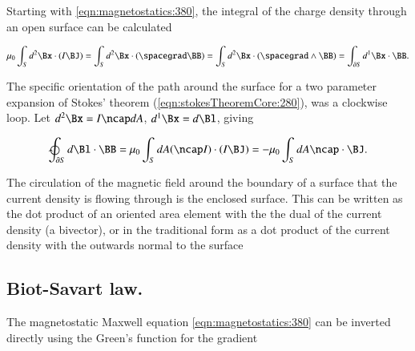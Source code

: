 Starting with
\cref{eqn:magnetostatics:380}, the
integral of the
charge density through an open surface can be calculated

\begin{dmath}\label{eqn:magnetostatics:720}
\mu_0 \int_S d^2 \Bx \cdot (I \BJ)
=
\int_S d^2 \Bx \cdot (\spacegrad \BB)
=
\int_S d^2 \Bx \cdot (\spacegrad \wedge \BB)
=
\int_{\partial S} d^1 \Bx \cdot \BB.
\end{dmath}

The specific orientation of the path around the surface for a two parameter expansion of Stokes' theorem (\cref{eqn:stokesTheoremCore:280}), was a clockwise loop.  Let
\( d^2 \Bx = I \ncap dA \), \( d^1 \Bx = d\Bl \), giving

\begin{dmath}\label{eqn:magnetostatics:740}
\ointclockwise_{\partial S} d\Bl \cdot \BB
= \mu_0 \int_S dA (\ncap I) \cdot (I \BJ)
= -\mu_0 \int_S dA \ncap \cdot \BJ.
\end{dmath}

The circulation of the magnetic field around the boundary of a surface that the current density is flowing through is the enclosed surface.  This can be written as the dot product of an oriented area element with the the dual of the current density (a bivector), or in the traditional form as a dot product of the current density with the outwards normal to the surface



\subsection{Biot-Savart law.}

The magnetostatic Maxwell equation \cref{eqn:magnetostatics:380} can be inverted directly using the Green's function for the gradient

